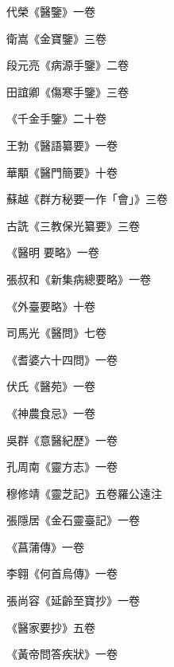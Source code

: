 \begin{pinyinscope}
 代榮《醫鑒》一卷



 衛嵩《金寶鑒》三卷



 段元亮《病源手鑒》二卷



 田誼卿《傷寒手鑒》三卷



 《千金手鑒》二十卷



 王勃《醫語纂要》一卷



 華顒《醫門簡要》十卷



 蘇越《群方秘要一作「會」》三卷



 古詵《三教保光纂要》三卷



 《醫明
 要略》一卷



 張叔和《新集病總要略》一卷



 《外臺要略》十卷



 司馬光《醫問》七卷



 《耆婆六十四問》一卷



 伏氏《醫苑》一卷



 《神農食忌》一卷



 吳群《意醫紀歷》一卷



 孔周南《靈方志》一卷



 穆修靖《靈芝記》五卷羅公遠注



 張隱居《金石靈臺記》一卷



 《菖蒲傳》一卷



 李翱《何首烏傳》一卷



 張尚容《延齡至寶抄》一卷



 《醫家要抄》五卷



 《黃帝問答疾狀》一卷




\end{pinyinscope}
